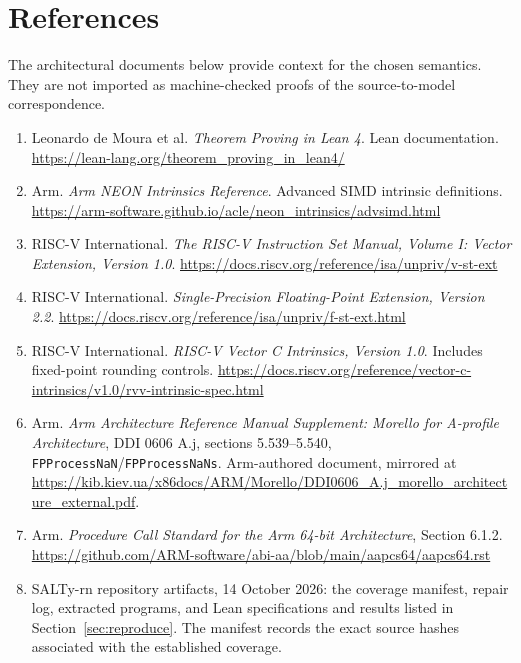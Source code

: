 \documentclass[11pt]{article}
\newcommand{\code}[1]{{\small\texttt{#1}}}
\begin{document}
\section*{References}
\small
The architectural documents below provide context for the chosen semantics. They are not imported as machine-checked proofs of the source-to-model correspondence.
\begin{enumerate}
\item Leonardo de Moura et al. \emph{Theorem Proving in Lean 4}. Lean documentation. \url{https://lean-lang.org/theorem_proving_in_lean4/}
\item Arm. \emph{Arm NEON Intrinsics Reference}. Advanced SIMD intrinsic definitions. \url{https://arm-software.github.io/acle/neon_intrinsics/advsimd.html}
\item RISC-V International. \emph{The RISC-V Instruction Set Manual, Volume I: Vector Extension, Version 1.0}. \url{https://docs.riscv.org/reference/isa/unpriv/v-st-ext}
\item RISC-V International. \emph{Single-Precision Floating-Point Extension, Version 2.2}. \url{https://docs.riscv.org/reference/isa/unpriv/f-st-ext.html}
\item RISC-V International. \emph{RISC-V Vector C Intrinsics, Version 1.0}. Includes fixed-point rounding controls. \url{https://docs.riscv.org/reference/vector-c-intrinsics/v1.0/rvv-intrinsic-spec.html}
\item Arm. \emph{Arm Architecture Reference Manual Supplement: Morello for A-profile Architecture}, DDI 0606 A.j, sections 5.539--5.540, \code{FPProcessNaN}/\code{FPProcessNaNs}. Arm-authored document, mirrored at \url{https://kib.kiev.ua/x86docs/ARM/Morello/DDI0606_A.j_morello_architecture_external.pdf}.
\item Arm. \emph{Procedure Call Standard for the Arm 64-bit Architecture}, Section 6.1.2. \url{https://github.com/ARM-software/abi-aa/blob/main/aapcs64/aapcs64.rst}
\item SALTy-rn repository artifacts, 14 October 2026: the coverage manifest, repair log, extracted programs, and Lean specifications and results listed in Section~\ref{sec:reproduce}. The manifest records the exact source hashes associated with the established coverage.
\end{enumerate}
\end{document}
